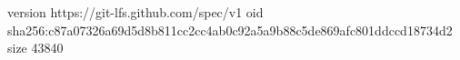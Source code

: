 version https://git-lfs.github.com/spec/v1
oid sha256:c87a07326a69d5d8b811cc2cc4ab0c92a5a9b88c5de869afc801ddccd18734d2
size 43840

